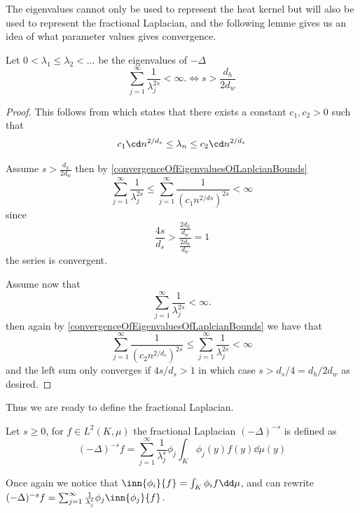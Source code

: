 The eigenvalues cannot only be used to represent the heat kernel but will also be used to represent the fractional Laplacian, and the following lemme gives us an idea of what parameter values gives convergence.
\begin{lemma}\label{convergenceOfEigenvaluesOfLaplacian}
	Let $0< \lambda_1 \leq \lambda_2 < \ldots$ be the eigenvalues of $-\Delta$
	\begin{equation}
		\sum_{j = 1}^{\infty} \frac{1}{\lambda_{j}^{2s}} < \infty. \iff s > \frac{d_h}{2d_w}
	\end{equation}
\end{lemma}
\begin{proof}
	This follows from \cite[lemma 5.1.3]{Kigami_2001} which states that there exists a constant $c_1, c_2 >0$ such that 
	\begin{equation} \label{convergenceOfEigenvaluesOfLaplcianBounds}
			c_1\cd n^{2/d_s} \leq \lambda_{n} \leq c_2\cd n^{2/d_s}
	\end{equation}

	
	Assume $s > \frac{d_h}{2d_w}$ then by \eqref{convergenceOfEigenvaluesOfLaplcianBounds}
	\begin{equation}
		\sum_{j = 1}^{\infty} \frac{1}{\lambda_j^{2s}} \leq \sum_{j = 1}^{\infty} \frac{1}{(c_1 n^{2/ds})^{2s}} < \infty
	\end{equation}
	since 
	\begin{equation}
		\frac{4s}{d_s} > \frac{\frac{2d_h}{d_w}}{\frac{2d_h}{d_w}} = 1
	\end{equation}
	the series is convergent.
	
	Assume now that 
	\begin{equation}
		\sum_{j = 1}^{\infty} \frac{1}{\lambda_{j}^{2s}} < \infty.
	\end{equation}
	then again by \eqref{convergenceOfEigenvaluesOfLaplcianBounds} we have that
	\begin{equation}
						\sum_{j = 1}^{\infty} \frac{1}{(c_2 n^{2/d_s})^{2s}} \leq \sum_{j = 1}^{\infty} \frac{1}{\lambda_{j}^{2s}} < \infty
	\end{equation}
	and the left sum only converges if $4s/d_s > 1$ in which case $s > d_s/4 = d_h/2d_w$ as desired.
\end{proof}



Thus we are ready to define the fractional Laplacian. 
\begin{defi}\label{fracLaplacian}
	Let $s \geq 0$, for $f \in L^2(K, \mu)$ the fractional Laplacian $(-\Delta)^{-s}$ is defined as
	\begin{equation}
		(-\Delta)^{-s}f = \sum_{j = 1}^{\infty} \frac{1}{\lambda_{j}^{s}} \phi_j \int_{K} \phi_j(y)f(y) \dd \mu(y)
	\end{equation}
\end{defi}
\begin{remark*}
	Once again we notice that $\inn{\phi_i}{f} = \int_{K} \phi_i f \dd \mu$, and can rewrite $(-\Delta)^{-s} f = \sum_{j = 1}^{\infty} \frac{1}{\lambda_j^{s}} \phi_j \inn{\phi_j}{f}$.
\end{remark*}

